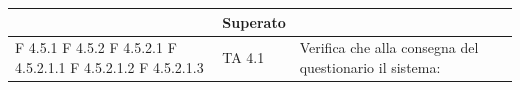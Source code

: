 \documentclass[a4paper,11pt]{article}
\begin{document}
\begin{longtable}{p{}p{}p{}p{}}
\begin{enumerate}
\end{enumerate} & Superato\\

\midrule
F 4.5.1 \newline F 4.5.2 \newline F 4.5.2.1 \newline F 4.5.2.1.1 \newline F 4.5.2.1.2 \newline F 4.5.2.1.3& TA 4.1 &Verifica che alla consegna del questionario il sistema: 

\end{longtable}
\end{document}
